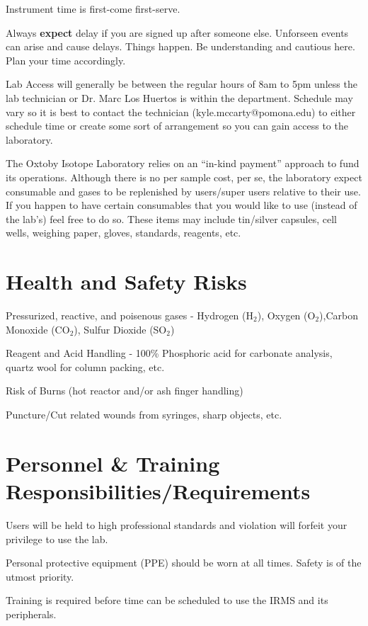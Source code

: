 \documentclass[12pt]{../SOP3_beta}\usepackage[]{graphicx}\usepackage[]{color}
\begin{document}
\NP Instrument time is first-come first-serve.

\NP Always \textbf{expect} delay if you are signed up after someone else. Unforseen events can arise and cause delays. Things happen. Be understanding and cautious here. Plan your time accordingly.

\NP Lab Access will generally be between the regular hours of 8am to 5pm unless the lab technician or Dr. Marc Los Huertos is within the department. Schedule may vary so it is best to contact the technician (kyle.mccarty@pomona.edu) to either schedule time or create some sort of arrangement so you can gain access to the laboratory.

\NP The Oxtoby Isotope Laboratory relies on an ``in-kind payment'' approach to fund its operations. Although there is no per sample cost, per se, the laboratory expect consumable and gases to be replenished by users/super users relative to their use. If you happen to have certain consumables that you would like to use (instead of the lab's) feel free to do so. These items may include tin/silver capsules, cell wells, weighing paper, gloves, standards, reagents, etc.


\section{Health and Safety Risks}

\NP Pressurized, reactive, and poisenous gases - Hydrogen (H$_2$), Oxygen (O$_2$),Carbon Monoxide (CO$_2$), Sulfur Dioxide (SO$_2$)

\NP Reagent and Acid Handling - 100\% Phosphoric acid for carbonate analysis, quartz wool for column packing, etc. 

\NP Risk of Burns (hot reactor and/or ash finger handling)

\NP Puncture/Cut related wounds from syringes, sharp objects, etc.

\section{Personnel \& Training Responsibilities/Requirements}

\NP Users will be held to high professional standards and violation will forfeit your privilege to use the lab.

\NP Personal protective equipment (PPE) should be worn at all times. Safety is of the utmost priority.

\NP Training is required before time can be scheduled to use the IRMS and its peripherals.
\end{document}
